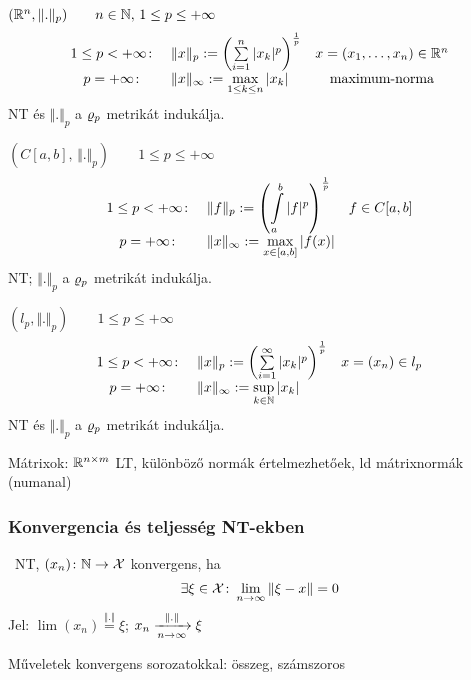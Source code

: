 \begin{Pl}
\item $(\mathbb{R}^n,\Vert.\Vert_p)\qquad n\in \mathbb{N},\, 1\leq p \leq
  +\infty$
  \[\displaystyle\begin{array}{clc}
  1\leq p < +\infty\colon & \Vert x \Vert_p := \left(\sum\limits_{i=1}^n
  |x_k|^p\right)^\frac1{p} & x=(x_1,\ldots,x_n)\in \mathbb{R}^n\\
  p=+\infty\colon &\Vert x \Vert_\infty := \max\limits_{1\leq
    k\leq n} |x_k|& \text{maximum-norma}\end{array}\]
  NT és $\Vert.\Vert_p$ a $\varrho_p$ metrikát indukálja.

\item  $(C[a,b],\, \Vert.\Vert_p)\qquad 1\leq p\leq+\infty$
  \[\displaystyle\begin{array}{clc}
  1\leq p < +\infty\colon & \Vert f \Vert_p := \left(\displaystyle\int\limits_a^b
  \vert f\vert^p\right)^\frac1{p} & f \in C[a,b]\\
  p=+\infty\colon &\Vert x \Vert_\infty := \max\limits_{x\in
    [a,b]} \vert f(x)\vert & \end{array}\]
  NT; $\Vert.\Vert_p$ a $\varrho_p$ metrikát indukálja.

\item $(l_p,\Vert.\Vert_p)\qquad 1\leq p \leq
  +\infty$
  \[\displaystyle\begin{array}{clc}
  1\leq p < +\infty\colon & \Vert x \Vert_p := \left(\sum\limits_{i=1}^\infty
  |x_k|^p\right)^\frac1{p} & x=(x_n)\in l_p\\
  p=+\infty\colon &\Vert x \Vert_\infty := \sup\limits_{k\in\mathbb{N}} 
  |x_k|& \end{array}\]
  NT és $\Vert.\Vert_p$ a $\varrho_p$ metrikát indukálja.
\item Mátrixok: $\mathbb{R}^{n\times m}$ LT, különböző normák
  értelmezhetőek, ld mátrixnormák (numanal)
\end{Pl}

\subsubsection{Konvergencia és teljesség NT-ekben}
\begin{de}\NT\ NT, $(x_n)\colon \mathbb{N}\to\mathcal{X}$ konvergens, ha  
  \[\exists \xi  \in \mathcal{X}\colon \lim_{n\to\infty} \Vert \xi-x \Vert=0\]
  Jel: $\lim(x_n)\stackrel{\Vert.\Vert}=\xi$; \quad $x_n  \xrightarrow[n\to\infty]{\Vert.\Vert} \xi$      
\end{de}

\begin{megj}
  Műveletek konvergens sorozatokkal: összeg, számszoros
\end{megj}


